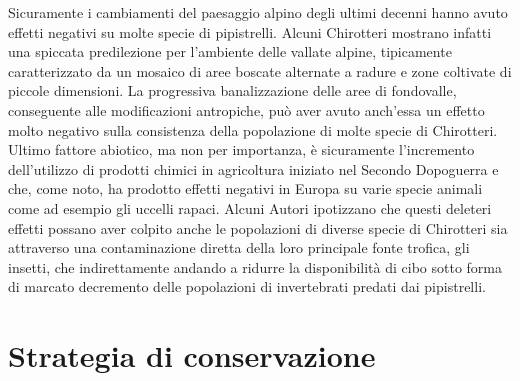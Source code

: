 \documentclass[10pt,twoside,openany,x11names,svgnames,italian,a5paper,dvipsnames,table]{memoir}
\newcommand\chapterillustration{}
\begin{document}
Sicuramente i cambiamenti del paesaggio alpino degli ultimi decenni hanno avuto effetti negativi su molte specie di pipistrelli. Alcuni Chirotteri mostrano infatti una spiccata predilezione per l’ambiente delle vallate alpine, tipicamente caratterizzato da un mosaico di aree boscate alternate a radure e zone coltivate di piccole dimensioni. La progressiva banalizzazione delle aree di fondovalle, conseguente alle modificazioni antropiche, può aver avuto anch’essa un effetto molto negativo sulla consistenza della popolazione di molte specie di Chirotteri. Ultimo fattore abiotico, ma non per importanza, è sicuramente l’incremento dell’utilizzo di prodotti chimici in agricoltura iniziato nel Secondo Dopoguerra e che, come noto, ha prodotto effetti negativi in Europa su varie specie animali come ad esempio gli uccelli rapaci. Alcuni Autori ipotizzano che questi deleteri effetti possano aver colpito anche le popolazioni di diverse specie di Chirotteri sia attraverso una contaminazione diretta della loro principale fonte trofica, gli insetti, che indirettamente andando a ridurre la disponibilità di cibo sotto forma di marcato decremento delle popolazioni di invertebrati predati dai pipistrelli. 


 
\chapter{Strategia di conservazione}
\renewcommand\chapterillustration{6.jpg}
\end{document}
